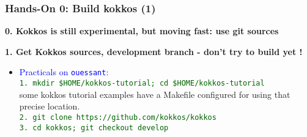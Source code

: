 \begin{frame}
  \frametitle{Hands-On 0: Build kokkos (1)}

  \hypertarget{handson0}{}
  \textbf{0. Kokkos is still experimental, but moving fast: use git sources}
  
  \textbf{1. Get Kokkos sources, development branch - don't try to build yet !}
  \begin{itemize}
  \item \textcolor{blue}{Practicals on \texttt{ouessant}:}\\
    \textcolor{darkgreen}{\texttt{1. mkdir \$HOME/kokkos-tutorial; cd \$HOME/kokkos-tutorial}}\\
    some kokkos tutorial examples have a Makefile configured for using that precise location.\\
    \textcolor{darkgreen}{\texttt{2. git clone https://github.com/kokkos/kokkos}}\\
    \textcolor{darkgreen}{\texttt{3. cd kokkos; git checkout develop}}
  \end{itemize}
  
\end{frame}

